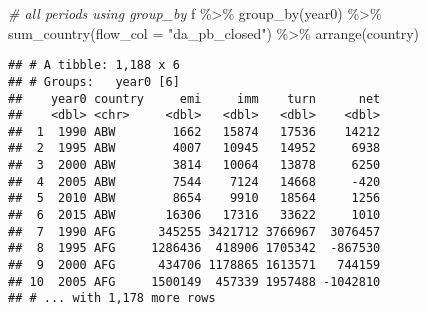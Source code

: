 \documentclass[
]{book}
\newenvironment{Shaded}{\begin{snugshade}}{\end{snugshade}}
\newcommand{\AttributeTok}[1]{\textcolor[rgb]{0.77,0.63,0.00}{#1}}
\newcommand{\CommentTok}[1]{\textcolor[rgb]{0.56,0.35,0.01}{\textit{#1}}}
\newcommand{\FunctionTok}[1]{\textcolor[rgb]{0.00,0.00,0.00}{#1}}
\newcommand{\NormalTok}[1]{#1}
\newcommand{\SpecialCharTok}[1]{\textcolor[rgb]{0.00,0.00,0.00}{#1}}
\newcommand{\StringTok}[1]{\textcolor[rgb]{0.31,0.60,0.02}{#1}}
\begin{document}
\begin{Shaded}
\begin{Highlighting}[]
\CommentTok{\# all periods using group\_by}
\NormalTok{f }\SpecialCharTok{\%\textgreater{}\%}
  \FunctionTok{group\_by}\NormalTok{(year0) }\SpecialCharTok{\%\textgreater{}\%}
  \FunctionTok{sum\_country}\NormalTok{(}\AttributeTok{flow\_col =} \StringTok{"da\_pb\_closed"}\NormalTok{) }\SpecialCharTok{\%\textgreater{}\%}
  \FunctionTok{arrange}\NormalTok{(country)}
\end{Highlighting}
\end{Shaded}

\begin{verbatim}
## # A tibble: 1,188 x 6
## # Groups:   year0 [6]
##    year0 country     emi     imm    turn      net
##    <dbl> <chr>     <dbl>   <dbl>   <dbl>    <dbl>
##  1  1990 ABW        1662   15874   17536    14212
##  2  1995 ABW        4007   10945   14952     6938
##  3  2000 ABW        3814   10064   13878     6250
##  4  2005 ABW        7544    7124   14668     -420
##  5  2010 ABW        8654    9910   18564     1256
##  6  2015 ABW       16306   17316   33622     1010
##  7  1990 AFG      345255 3421712 3766967  3076457
##  8  1995 AFG     1286436  418906 1705342  -867530
##  9  2000 AFG      434706 1178865 1613571   744159
## 10  2005 AFG     1500149  457339 1957488 -1042810
## # ... with 1,178 more rows
\end{verbatim}

  
\end{document}
